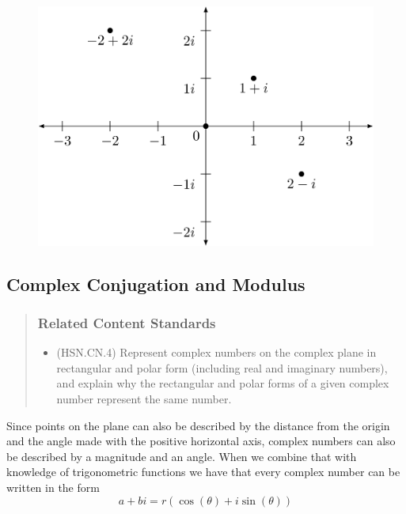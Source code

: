 \documentclass[
]{book}
\providecommand{\tightlist}{%
  \setlength{\itemsep}{0pt}\setlength{\parskip}{0pt}}
\theoremstyle{definition}
\theoremstyle{definition}
\theoremstyle{definition}
\theoremstyle{remark}
\begin{document}
\begin{figure}

{\centering \includegraphics[width=0.6\linewidth]{tikz/complex-rectangular} 

}

\end{figure}

\hypertarget{complex-conjugation-and-modulus}{%
\subsection{Complex Conjugation and Modulus}\label{complex-conjugation-and-modulus}}

\begin{quote}
\hypertarget{related-content-standards-19}{%
\subsubsection*{Related Content Standards}\label{related-content-standards-19}}

\begin{itemize}
\tightlist
\item
  (HSN.CN.4) Represent complex numbers on the complex plane in rectangular and polar form (including real and imaginary numbers), and explain why the rectangular and polar forms of a given complex number represent the same number.
\end{itemize}
\end{quote}

Since points on the plane can also be described by the distance from the origin and the angle made with the positive horizontal axis, complex numbers can also be described by a magnitude and an angle. When we combine that with knowledge of trigonometric functions we have that every complex number can be written in the form
\[a+bi = r(\cos(\theta) + i \sin(\theta))\]
\end{document}
